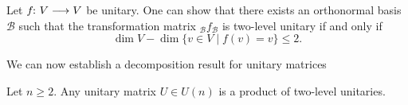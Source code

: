 \documentclass[a4paper, oneside, 12pt]{amsart}
\begin{document}
\begin{remark}\label{rmk:abstract-definition-of-two-level-unitaries}
  Let \(f \from V \to V\) be unitary.
  One can show that there exists an orthonormal basis \(\mathcal{B}\) such that the transformation matrix \(_{\mathcal{B}}f_{\mathcal{B}}\) is two-level unitary if and only if
  \begin{equation*}
    \dim V - \dim\{v \in V \mid f(v) = v\} \leq 2.
  \end{equation*}
\end{remark}

We can now establish a decomposition result for unitary matrices

\begin{lemma}\label{lem:two-level-unitaries-do-the-job}
  Let \( n \geq 2 \).
  Any unitary matrix \( U \in U(n) \) is a product of two-level unitaries.
\end{lemma}
\end{document}
